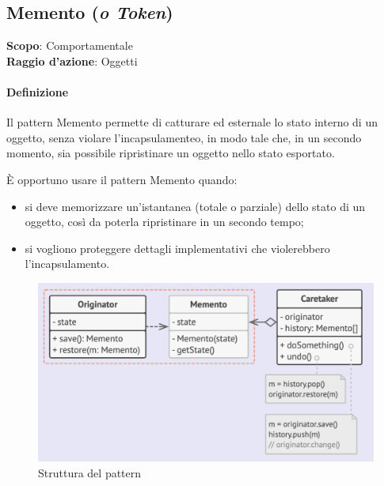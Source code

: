 \subsection{Memento (\textit{o Token})}
\label{memento}

\textbf{Scopo}: Comportamentale \\
\textbf{Raggio d'azione}: Oggetti

\paragraph{Definizione} Il pattern Memento permette di catturare ed esternale lo stato interno di un oggetto, senza violare l'incapsulamenteo, in modo tale che, in un secondo momento, sia possibile ripristinare un oggetto nello stato esportato.

È opportuno usare il pattern Memento quando:
\begin{itemize}
    \item si deve memorizzare un'istantanea (totale o parziale) dello stato di un oggetto, così da poterla ripristinare in un secondo tempo;
    \item si vogliono proteggere dettagli implementativi che violerebbero l'incapsulamento.
\end{itemize}

\begin{figure}[H]
    \centering
    \includegraphics[width=1\linewidth]{assets/pattern/memento/memento-struttura.png}
    \caption{Struttura del pattern}
\end{figure}

